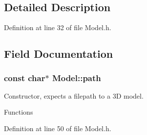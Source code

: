 \subsection{Detailed Description}


Definition at line 32 of file Model.\+h.



\subsection{Field Documentation}
\subsubsection[{\texorpdfstring{path}{path}}]{\setlength{\rightskip}{0pt plus 5cm}const char$\ast$ Model\+::path}\hypertarget{class_model_af94ddde9af2f1fcee96a5aca53e48ed1}{}\label{class_model_af94ddde9af2f1fcee96a5aca53e48ed1}


Constructor, expects a filepath to a 3D model. 

Functions 

Definition at line 50 of file Model.\+h.

